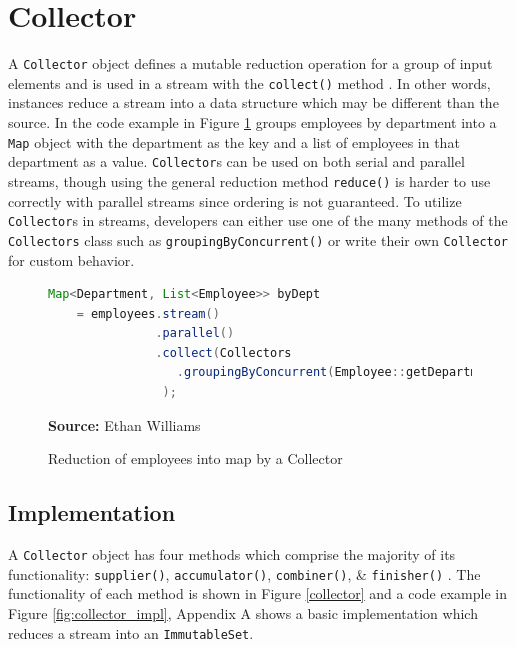 \documentclass[oneside, 12pt]{article}
\newcommand{\source}[1]{\textbf{Source:} {#1} }
\begin{document}
\section{Collector}
A \verb|Collector| object defines a mutable reduction operation for a group of input elements and is used in a stream with the \verb|collect()| method \autocite{}. In other words, instances reduce a stream into a data structure which may be different than the source. In the code example in Figure \ref{fig:employee_collection} groups employees by department into a \verb|Map| object with the department as the key and a list of employees in that department as a value. \verb|Collector|s can be used on both serial and parallel streams, though using the general reduction method \verb|reduce()| is harder to use correctly with parallel streams since ordering is not guaranteed. To utilize \verb|Collector|s in streams, developers can either use one of the many methods of the \verb|Collectors| class such as \verb|groupingByConcurrent()| or write their own \verb|Collector| for custom behavior.

\begin{figure}[H]
\centering
\begin{lstlisting}[language=Java]
Map<Department, List<Employee>> byDept
    = employees.stream()
               .parallel()
               .collect(Collectors
                  .groupingByConcurrent(Employee::getDepartment)
                );
\end{lstlisting}
\caption{Reduction of employees into map by a Collector}
\source{Ethan Williams}
\label{fig:employee_collection}
\end{figure}

\subsection{Implementation}

A \verb|Collector| object has four methods which comprise the majority of its functionality: \verb|supplier()|, \verb|accumulator()|, \verb|combiner()|, \& \verb|finisher()| \autocite{collector_doc}. The functionality of each method is shown in Figure \ref{collector} and a code example in Figure \ref{fig:collector_impl}, Appendix A shows a basic implementation which reduces a stream into an \verb|ImmutableSet|.
\end{document}
